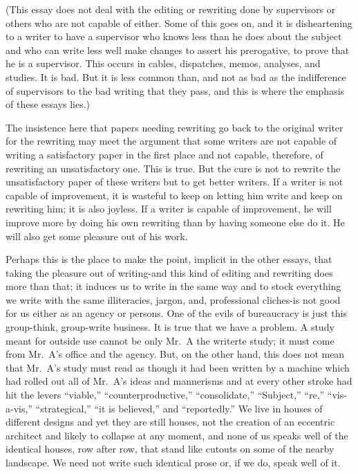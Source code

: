 \documentclass[
    oneside,
    11pt,
]{memoir}
\begin{document}
(This essay does not deal with the editing or rewriting done by supervisors or others who are not capable of either. Some of this goes on, and it is disheartening to a writer to have a supervisor who knows less than he does about the subject and who can write less well make changes to assert his prerogative, to prove that he is a supervisor. This occurs in cables, dispatches, memos, analyses, and studies. It is bad. But it is less common than, and not as bad as the indifference of supervisors to the bad writing that they pass, and this is where the emphasis of these essays lies.) 

The insistence here that papers needing rewriting go back to the original writer for the rewriting may meet the argument that some writers are not capable of writing a satisfactory paper in the first place and not capable, therefore, of rewriting an unsatisfactory one. This is true. But the cure is not to rewrite the unsatisfactory paper of these writers but to get better writers. If a writer is not capable of improvement, it is wasteful to keep on letting him write and keep on rewriting him; it is also joyless. If a writer is capable of improvement, he will improve more by doing his own rewriting than by having someone else do it. He will also get some pleasure out of his work.

Perhaps this is the place to make the point, implicit in the other essays, that taking the pleasure out of writing-and this kind of editing and rewriting does more than that; it induces us to write in the same way and to stock everything we write with the same illiteracies, jargon, and, professional cliches-is not good for us either as an agency or persons. One of the evils of bureaucracy is just this group-think, group-write business. It is true that we have a problem. A study meant for outside use cannot be only Mr.\ A the writerte study; it must come from Mr.\ A's office and the agency. But, on the other hand, this does not mean that Mr.\ A's study must read as though it had been written by a machine which had rolled out all of Mr.\ A's ideas and mannerisms and at every other stroke had hit the levers \enquote{viable,} \enquote{counterproductive,} \enquote{consolidate,} \enquote{Subject,} \enquote{re,} \enquote{vis-a-vis,} \enquote{strategical,} \enquote{it is believed,} and \enquote{reportedly.} We live in houses of different designs and yet they are still houses, not the creation of an eccentric architect and likely to collapse at any moment, and none of us speaks well of the identical houses, row after row, that stand like cutouts on some of the nearby landscape. We need not write such identical prose or, if we do, speak well of it.
\end{document}
